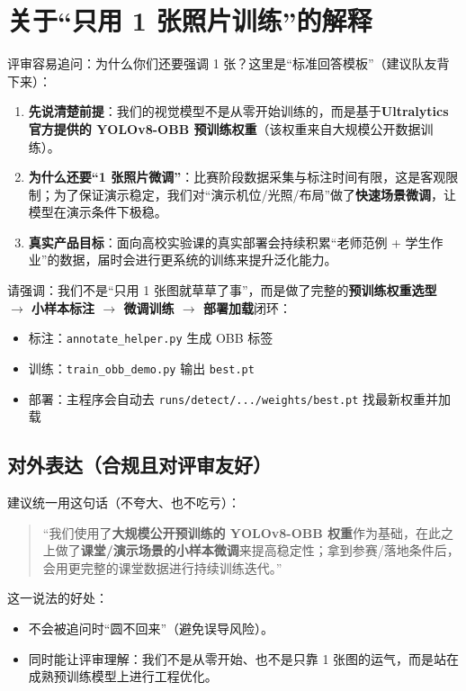 \documentclass[a4paper,AutoFakeBold,oneside,12pt]{book}
\begin{document}
\section{关于“只用 1 张照片训练”的解释}
评审容易追问：为什么你们还要强调 1 张？这里是“标准回答模板”（建议队友背下来）：

\begin{enumerate}
    \item \textbf{先说清楚前提}：我们的视觉模型不是从零开始训练的，而是基于\textbf{Ultralytics 官方提供的 YOLOv8-OBB 预训练权重}（该权重来自大规模公开数据训练）。
    \item \textbf{为什么还要“1 张照片微调”}：比赛阶段数据采集与标注时间有限，这是客观限制；为了保证演示稳定，我们对“演示机位/光照/布局”做了\textbf{快速场景微调}，让模型在演示条件下极稳。
    \item \textbf{真实产品目标}：面向高校实验课的真实部署会持续积累“老师范例 + 学生作业”的数据，届时会进行更系统的训练来提升泛化能力。
\end{enumerate}

请强调：我们不是“只用 1 张图就草草了事”，而是做了完整的\textbf{预训练权重选型 $\rightarrow$ 小样本标注 $\rightarrow$ 微调训练 $\rightarrow$ 部署加载}闭环：
\begin{itemize}
    \item 标注：\texttt{annotate\_helper.py} 生成 OBB 标签
    \item 训练：\texttt{train\_obb\_demo.py} 输出 \texttt{best.pt}
    \item 部署：主程序会自动去 \texttt{runs/detect/.../weights/best.pt} 找最新权重并加载
\end{itemize}

\subsection{对外表达（合规且对评审友好）}
建议统一用这句话（不夸大、也不吃亏）：
\begin{quote}
“我们使用了\textbf{大规模公开预训练的 YOLOv8-OBB 权重}作为基础，在此之上做了\textbf{课堂/演示场景的小样本微调}来提高稳定性；拿到参赛/落地条件后，会用更完整的课堂数据进行持续训练迭代。”
\end{quote}

这一说法的好处：
\begin{itemize}
    \item 不会被追问时“圆不回来”（避免误导风险）。
    \item 同时能让评审理解：我们不是从零开始、也不是只靠 1 张图的运气，而是站在成熟预训练模型上进行工程优化。
\end{itemize}
\end{document}
